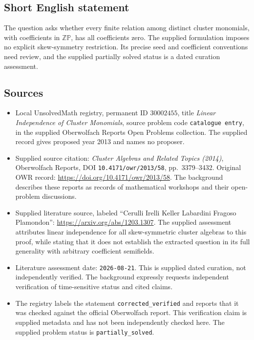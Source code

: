 \documentclass[11pt]{article}
\begin{document}
\subsection{Short English statement}
The question asks whether every finite relation among distinct cluster monomials, with coefficients in \(\mathbb Z\mathbb P\), has all coefficients zero. The supplied formulation imposes no explicit skew-symmetry restriction. Its precise seed and coefficient conventions need review, and the supplied partially solved status is a dated curation assessment.
\subsection{Sources}
\begin{itemize}
\item Local UnsolvedMath registry, permanent ID \(30002455\), title \emph{Linear Independence of Cluster Monomials}, source problem code \texttt{catalogue entry}, in the supplied Oberwolfach Reports Open Problems collection. The supplied record gives proposed year 2013 and names no proposer.
\item Supplied source citation: \emph{Cluster Algebras and Related Topics (2014)}, Oberwolfach Reports, DOI \texttt{10.4171/owr/2013/58}, pp.~3379--3432. Original OWR record: \url{https://doi.org/10.4171/owr/2013/58}. The background describes these reports as records of mathematical workshops and their open-problem discussions.
\item Supplied literature source, labeled ``Cerulli Irelli Keller Labardini Fragoso Plamondon'': \url{https://arxiv.org/abs/1203.1307}. The supplied assessment attributes linear independence for all skew-symmetric cluster algebras to this proof, while stating that it does not establish the extracted question in its full generality with arbitrary coefficient semifields.
\item Literature assessment date: \texttt{2026-08-21}. This is supplied dated curation, not independently verified. The background expressly requests independent verification of time-sensitive status and cited claims.
\item The registry labels the statement \texttt{corrected\_verified} and reports that it was checked against the official Oberwolfach report. This verification claim is supplied metadata and has not been independently checked here. The supplied problem status is \texttt{partially\_solved}.
\end{itemize}
\end{document}
